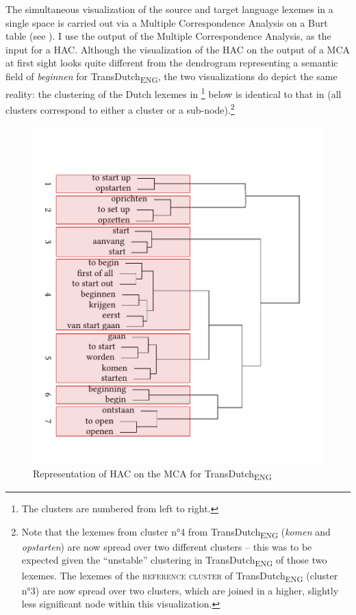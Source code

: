 The simultaneous visualization of the source and target language lexemes in a single space is carried out via a Multiple Correspondence Analysis on a Burt table \citep{greenacre_simple_2006, greenacre_correspondence_2007} (see ). I use the output of the Multiple Correspondence Analysis, as the input for a HAC. Although the visualization of the HAC on the output of a MCA at first sight looks quite different from the dendrogram representing a semantic field of \textit{beginnen} for TransDutch\textsubscript{ENG}, the two visualizations do depict the same reality: the clustering of the Dutch lexemes in \footnote{The clusters are numbered from left to right.} below is identical to that in  (all clusters correspond to either a cluster or a sub-node).\footnote{Note that the lexemes from cluster n°4 from TransDutch\textsubscript{ENG} (\textit{komen} and \textit{opstarten}) are now spread over two different clusters – this was to be expected given the ``unstable'' clustering in TransDutch\textsubscript{ENG} of those two lexemes. The lexemes of the \textsc{reference cluster} of TransDutch\textsubscript{ENG} (cluster n°3) are now spread over two clusters, which are joined in a higher, slightly less significant node within this visualization.}

\begin{figure}
\includegraphics[width=\textwidth]{figures/tree92.pdf}
\caption{\label{fig:4:89}Representation of HAC on the MCA for TransDutch\textsubscript{ENG}}
\end{figure}

